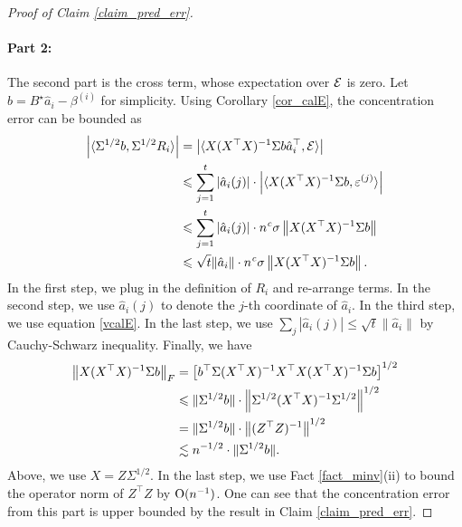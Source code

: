 \begin{proof}[Proof of Claim \ref{claim_pred_err}]
	\paragraph{Part 2:} The second part is the cross term, whose expectation over $\cE$ is zero.
	Let $b = B^{\star} \hat{a}_i - \beta^{(i)}$ for simplicity.
	Using Corollary \ref{cor_calE}, the concentration error can be bounded as
	\begin{align*}
		{\left| {\langle \Sigma^{1/2}b, \Sigma^{1/2}R_i \rangle} \right|}
		&= {\left| {\langle X (X^{\top}X)^{-1} \Sigma b \hat{a}_i^{\top}, \mathcal{E} \rangle} \right|} \\
		&\leqslant \sum_{j=1}^t \left\lvert\hat{a}_i(j)\right\rvert \cdot {\left| {\langle X (X^{\top} X)^{-1} \Sigma b, \varepsilon^{(j)} \rangle} \right|} \\
		&\leqslant \sum_{j=1}^t \left\lvert\hat{a}_i(j)\right\rvert \cdot n^{{\mathit{c}}}\sigma \left\| X (X^{\top}X)^{-1} \Sigma b \right\| \\
		&\leqslant \sqrt{t} \|\hat{a}_i\| \cdot n^{{\mathit{c}}} \sigma \left\| X (X^{\top} X)^{-1} \Sigma b \right\|.
	\end{align*}
	In the first step, we plug in the definition of $R_i$ and re-arrange terms.
	In the second step, we use $\hat{a}_i(j)$ to denote the $j$-th coordinate of $\hat{a}_i$.
	In the third step, we use equation \eqref{vcalE}.
	In the last step, we use $\sum_j |\hat a_i(j)|\le \sqrt{t}\|\hat a_i\|$ by Cauchy-Schwarz inequality.
	Finally, we have
	\begin{align*}
		\left\|  X(X^\top X)^{-1}\Sigma b \right\|_{F} &=\left[ {b}^\top \Sigma (X^\top X)^{-1}X^\top X(X^\top X)^{-1}\Sigma b \right]^{1/2} \\
		&\leqslant  \|\Sigma^{1/2} b \|  \cdot \left\| \Sigma^{1/2}(X^\top X)^{-1}\Sigma ^{1/2} \right\|^{1/2}  \\
		&=   \|\Sigma^{1/2} b \|  \cdot \left\| (Z^\top Z)^{-1}\right\|^{1/2}  \\
		& \lesssim n^{-1/2} \cdot \|\Sigma^{1/2} b\|.
	\end{align*}
	Above, we use $X=Z\Sigma^{1/2}$. In the last step, we use Fact \ref{fact_minv}(ii) to bound the operator norm of $Z^\top Z$ by $\operatorname{O}(n^{-1})$. %
	One can see that the concentration error from this part is upper bounded by the result in Claim \ref{claim_pred_err}.
	
	\iffalse
	Next, we use the fact that the spectral norm of $\cE$ is at most $\sigma \cdot p^{\e}$.
	Hence, the spectral norm of $\Sigma^{1/2} E_i$ is at most
		\[ \sigma \cdot p^{\e} \cdot \norm{\Sigma^{1/2} (X^{\top} X)^{-1} X^{\top}} \cdot \norm{\hat{a}_i}. \]
	Therefore, the cross term is bounded by $\sigma \cdot p^{\e}$ times
	\begin{align*}
			& \bignorm{\Sigma^{1/2} (B^{\star} \hat{a}_i - \beta_i)} \cdot \norm{\Sigma^{1/2} (X^{\top} X)^{-1} X^{\top}} \cdot \norm{\hat{a}_i} \\
		\le & \bignorm{\Sigma^{1/2} (B^{\star} \hat{a}_i - \beta_i)}^2 + \norm{\hat{a}_i}^2 \cdot \bignorm{\Sigma^{1/2} (X^{\top} X)^{-1} X^{\top}}^2 \tag{by Cauchy-Shwartz inequality} \\
		\le & \bignorm{\Sigma^{1/2}(B^{\star} \hat{a}_i - \beta_i)} + \norm{\hat{a}_i}^2 \cdot \bigtr{\Sigma (X^{\top} X)^{-1}}.
	\end{align*}
	\fi


\end{proof}
